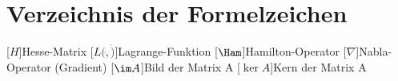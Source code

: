 \chapter*{Verzeichnis der Formelzeichen}
\begin{acronym}[LabVIEW] %
	[\ensuremath{H}]{Hesse-Matrix}
	[\ensuremath{L(\dot,\dot)}]{Lagrange-Funktion}
	[\ensuremath{\Ham}]{Hamilton-Operator}
	[\ensuremath{\nabla}]{Nabla-Operator (Gradient)}
	[\ensuremath{\im A}]{Bild der Matrix A}
	[\ensuremath{\ker A}]{Kern der Matrix A}
\end{acronym}